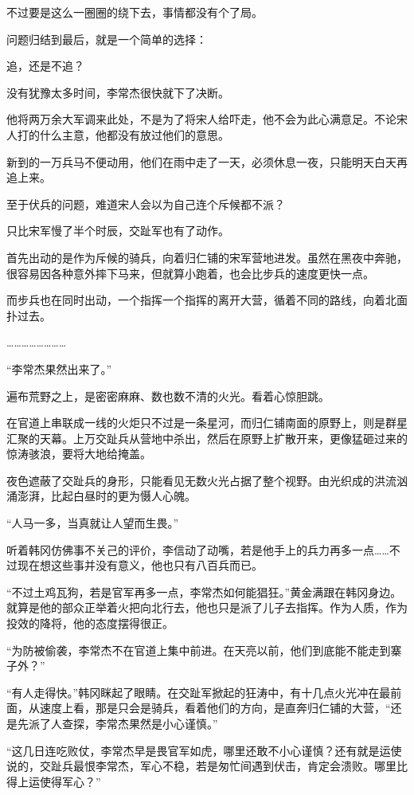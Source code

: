 不过要是这么一圈圈的绕下去，事情都没有个了局。

问题归结到最后，就是一个简单的选择：

追，还是不追？

没有犹豫太多时间，李常杰很快就下了决断。

他将两万余大军调来此处，不是为了将宋人给吓走，他不会为此心满意足。不论宋人打的什么主意，他都没有放过他们的意思。

新到的一万兵马不便动用，他们在雨中走了一天，必须休息一夜，只能明天白天再追上来。

至于伏兵的问题，难道宋人会以为自己连个斥候都不派？

只比宋军慢了半个时辰，交趾军也有了动作。

首先出动的是作为斥候的骑兵，向着归仁铺的宋军营地进发。虽然在黑夜中奔驰，很容易因各种意外摔下马来，但就算小跑着，也会比步兵的速度更快一点。

而步兵也在同时出动，一个指挥一个指挥的离开大营，循着不同的路线，向着北面扑过去。

……………………

“李常杰果然出来了。”

遍布荒野之上，是密密麻麻、数也数不清的火光。看着心惊胆跳。

在官道上串联成一线的火炬只不过是一条星河，而归仁铺南面的原野上，则是群星汇聚的天幕。上万交趾兵从营地中杀出，然后在原野上扩散开来，更像猛砸过来的惊涛骇浪，要将大地给掩盖。

夜色遮蔽了交趾兵的身形，只能看见无数火光占据了整个视野。由光织成的洪流汹涌澎湃，比起白昼时的更为慑人心魄。

“人马一多，当真就让人望而生畏。”

听着韩冈仿佛事不关己的评价，李信动了动嘴，若是他手上的兵力再多一点……不过现在想这些事并没有意义，他也只有八百兵而已。

“不过土鸡瓦狗，若是官军再多一点，李常杰如何能猖狂。”黄金满跟在韩冈身边。就算是他的部众正举着火把向北行去，他也只是派了儿子去指挥。作为人质，作为投效的降将，他的态度摆得很正。

“为防被偷袭，李常杰不在官道上集中前进。在天亮以前，他们到底能不能走到寨子外？”

“有人走得快。”韩冈眯起了眼睛。在交趾军掀起的狂涛中，有十几点火光冲在最前面，从速度上看，那是只会是骑兵，看着他们的方向，是直奔归仁铺的大营，“还是先派了人查探，李常杰果然是小心谨慎。”

“这几日连吃败仗，李常杰早是畏官军如虎，哪里还敢不小心谨慎？还有就是运使说的，交趾兵最恨李常杰，军心不稳，若是匆忙间遇到伏击，肯定会溃败。哪里比得上运使得军心？”

